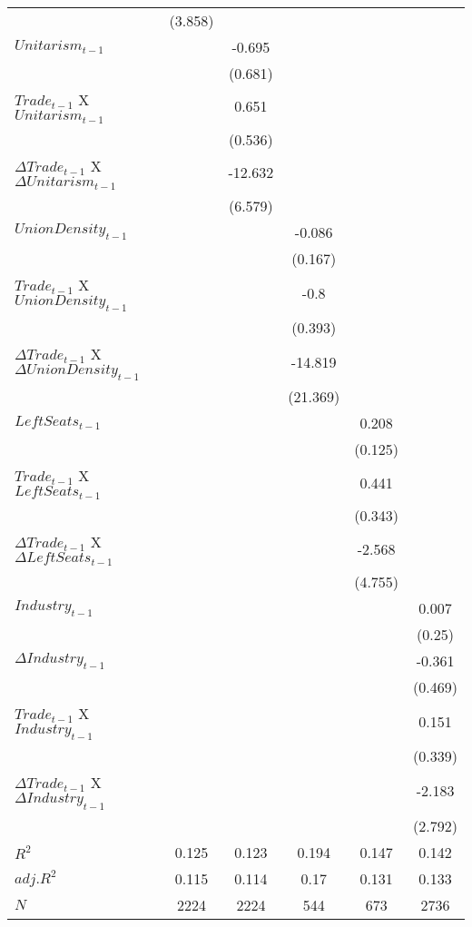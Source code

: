 \begin{table}[htbp]
\begin{tabular}{l*{5}{c}}
  		&(3.858) 		& 		& 		& 		& \\
$Unitarism_{t-1}$		& 		&-0.695 		& 		& 		& \\
  		& 		&(0.681) 		& 		& 		& \\
$Trade_{t-1}$ X $Unitarism_{t-1}$ 		& 		&0.651 		& 		& 		& \\
  		& 		&(0.536) 		& 		& 		& \\
$\Delta Trade_{t-1}$ X $\Delta Unitarism_{t-1}$ 		& 		&-12.632\sym{*} 		& 		& 		& \\
  		& 		&(6.579) 		& 		& 		& \\
$UnionDensity_{t-1}$ 		& 		& 		&-0.086 		& 		& \\
  		& 		& 		&(0.167) 		& 		& \\
$Trade_{t-1}$ X $UnionDensity_{t-1}$  		& 		& 		&-0.8\sym{**} 		& 		& \\
  		& 		& 		&(0.393) 		& 		& \\
$\Delta Trade_{t-1}$ X $\Delta UnionDensity_{t-1}$ 		& 		& 		&-14.819 		& 		& \\
  		& 		& 		&(21.369) 		& 		& \\
$LeftSeats_{t-1}$ 		& 		& 		& 		&0.208\sym{*} 		& \\
  		& 		& 		& 		&(0.125) 		& \\
$Trade_{t-1}$ X $ LeftSeats_{t-1}$		& 		& 		& 		&0.441 		& \\
  		& 		& 		& 		&(0.343) 		& \\
$\Delta Trade_{t-1}$ X $\Delta LeftSeats_{t-1}$ 		& 		& 		& 		&-2.568 		& \\
  		& 		& 		& 		&(4.755) 		& \\
$Industry_{t-1}$ 		& 		& 		& 		& 		&0.007 \\
  		& 		& 		& 		& 		&(0.25) \\
$\Delta Industry_{t-1}$ 		& 		& 		& 		& 		&-0.361 \\
  		& 		& 		& 		& 		&(0.469) \\
$Trade_{t-1}$ X $ Industry_{t-1}$		& 		& 		& 		& 		&0.151 \\
  		& 		& 		& 		& 		&(0.339) \\
$\Delta Trade_{t-1}$ X $\Delta Industry_{t-1}$ 		& 		& 		& 		& 		&-2.183 \\
  		& 		& 		& 		& 		&(2.792) \\
\hline
$R^2$ 		&0.125 		&0.123 		&0.194 		&0.147 		&0.142 \\
$adj.R^2$ 		&0.115 		&0.114 		&0.17 		&0.131 		&0.133 \\
$N$ 		&\multicolumn{1}{c}{2224} 		&\multicolumn{1}{c}{2224} 		&\multicolumn{1}{c}{544} 		&\multicolumn{1}{c}{673} 		&\multicolumn{1}{c}{2736} \\

\end{tabular}
\end{table}

